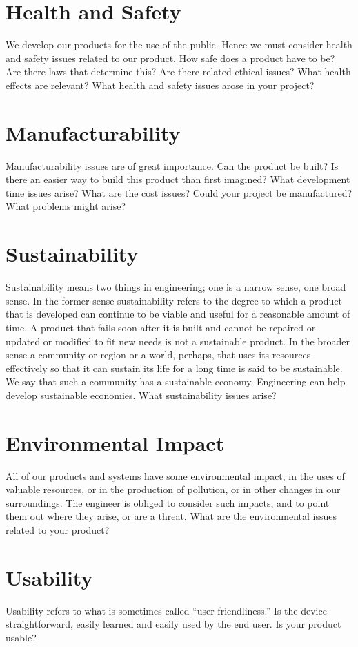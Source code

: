 \section{Health and Safety}
We develop our products for the use of the public. Hence we must consider health and safety issues related to our product. How safe does a product have to be? Are there laws that determine this? Are there related ethical issues? What health effects are relevant? What health and safety issues arose in your project?

\section{Manufacturability}
Manufacturability issues are of great importance. Can the product be built? Is there an easier way to build this product than first imagined? What development time issues arise? What are the cost issues? Could your project be manufactured? What problems might arise?

\section{Sustainability} 
Sustainability means two things in engineering; one is a narrow sense, one broad sense. In the former sense sustainability refers to the degree to which a product that is developed can continue to be viable and useful for a reasonable amount of time. A product that fails soon after it is built and cannot be repaired or updated or modified to fit new needs is not a sustainable product. In the broader sense a community or region or a world, perhaps, that uses its resources effectively so that it can sustain its life for a long time is said to be sustainable. We say that such a community has a sustainable economy. Engineering can help develop sustainable economies. What sustainability issues arise?

\section{Environmental Impact} 
All of our products and systems have some environmental impact, in the uses of valuable resources, or in the production of pollution, or in other changes in our surroundings. The engineer is obliged to consider such impacts, and to point them out where they arise, or are a threat. What are the environmental issues related to your product?

\section{Usability} 
Usability refers to what is sometimes called “user-friendliness.” Is the device straightforward, easily learned and easily used by the end user. Is your product usable?

